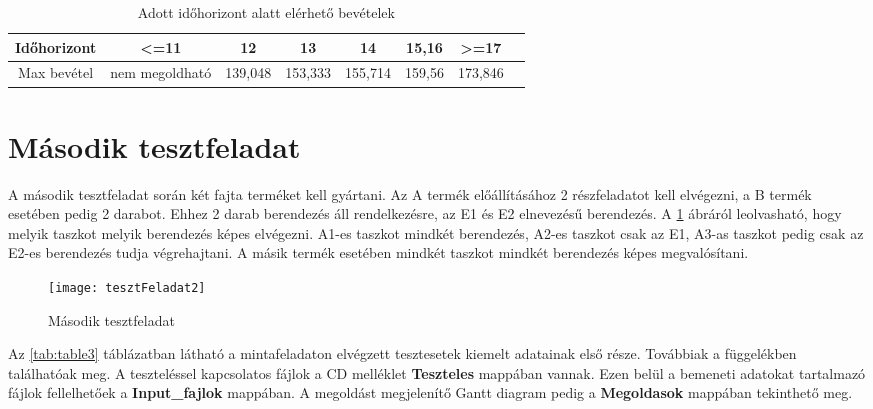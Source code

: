 \begin{table}[H]
	\begin{center}
		\caption{Adott időhorizont alatt elérhető bevételek}
  		\captionsetup[table]{skip=10pt}
    	\label{tab:table2}
		\begin{tabular}{|c|c|c|c|c|c|c|c|}
		\hline
		Időhorizont & \textless =11 & 12 & 13 & 14 & 15,16 & \textgreater =17\\
		\hline
		Max bevétel & nem megoldható & 139,048 & 153,333 & 155,714 & 159,56 & 173,846\\
		\hline
		\end{tabular}	
	\end{center}	
\end{table}

\section{Második tesztfeladat}
A második tesztfeladat során két fajta terméket kell gyártani. Az A termék előállításához 2 részfeladatot kell elvégezni, a B termék esetében pedig 2 darabot. Ehhez 2 darab berendezés áll rendelkezésre, az E1 és E2 elnevezésű berendezés. A \ref{tesztFeladat2} ábráról leolvasható, hogy melyik taszkot melyik berendezés képes elvégezni. A1-es taszkot mindkét berendezés, A2-es taszkot csak az E1, A3-as taszkot pedig csak az E2-es berendezés tudja végrehajtani. A másik termék esetében mindkét taszkot mindkét berendezés képes megvalósítani.

\begin{figure}[H]
\begin{center}
\texttt{[image: tesztFeladat2]}
\caption{Második tesztfeladat}
\label{tesztFeladat2}
\end{center}
\end{figure}

Az \ref{tab:table3} táblázatban látható a mintafeladaton elvégzett tesztesetek kiemelt adatainak első része. Továbbiak a függelékben találhatóak meg. A teszteléssel kapcsolatos fájlok a CD melléklet \textbf{Teszteles} mappában vannak. Ezen belül a bemeneti adatokat tartalmazó fájlok fellelhetőek a \textbf{Input\_fajlok} mappában. A megoldást megjelenítő Gantt diagram pedig a \textbf{Megoldasok} mappában tekinthető meg.

